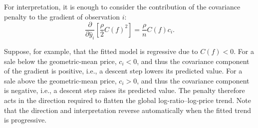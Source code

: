 \documentclass[10pt]{article}
\theoremstyle{definition}
\newcommand{\1}{\mathbf{1}}
\begin{document}
{%


{For interpretation, it is enough to consider the contribution of the covariance penalty to the gradient of observation $i$:}
{
\begin{equation}
\label{eq:direct_penalty_gradient}
\frac{\partial}{\partial \widehat y_i}
\left[
\frac{\rho}{2}C(f)^2
\right]
=
\frac{\rho}{n}C(f)c_i.
\end{equation}
}




{Suppose, for example, that the fitted model is regressive due to $C(f)<0$. For a sale below the geometric-mean price, $c_i<0$, and thus the covariance component of the gradient is positive, i.e., a descent step lowers its predicted value. For a sale above the geometric-mean price, $c_i>0$, and thus the covariance component is negative, i.e., a descent step raises its predicted value. The penalty therefore acts in the direction required to flatten the global log-ratio--log-price trend. Note that the direction and interpretation reverse automatically when the fitted trend is progressive.}


}
\end{document}
